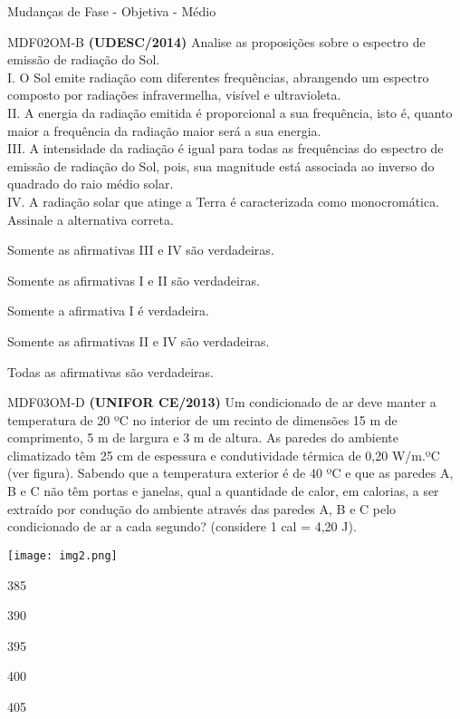 \documentclass[12pt]{article}
\begin{document}
\begin{quiz}{Mudanças de Fase - Objetiva - Médio}
		\begin{multi}[points=1,penalty=0]{MDF02OM-B}
			\textbf{(UDESC/2014)} Analise as proposições sobre o espectro de emissão de radiação do Sol.\\			
			I.	O Sol emite radiação com diferentes frequências, abrangendo um espectro composto por radiações infravermelha, visível e ultravioleta.\\
			II.	A energia da radiação emitida é proporcional a sua frequência, isto é, quanto maior a frequência da radiação maior será a sua energia.\\
			III.	A intensidade da radiação é igual para todas as frequências do espectro de emissão de radiação do Sol, pois, sua magnitude está associada ao inverso do quadrado do raio médio solar.\\
			IV.	A radiação solar que atinge a Terra é caracterizada como monocromática.\\			
			Assinale a alternativa correta.							
			\item Somente as afirmativas III e IV são verdadeiras.
			\item* Somente as afirmativas I e II são verdadeiras.
			\item Somente a afirmativa I é verdadeira.
			\item Somente as afirmativas II e IV são verdadeiras.
			\item Todas as afirmativas são verdadeiras.
		\end{multi}
		\begin{multi}[points=1,penalty=0]{MDF03OM-D}
			\textbf{(UNIFOR CE/2013)} Um condicionado de ar deve manter a temperatura de 20 ºC no interior de um recinto de dimensões 15 m de comprimento, 5 m de largura e 3 m de altura. As paredes do ambiente climatizado têm 25 cm de espessura e condutividade térmica de 0,20 W/m.ºC (ver figura).
			Sabendo que a temperatura exterior é de 40 ºC e que as paredes A, B e C não têm portas e janelas, qual a quantidade de calor, em calorias, a ser extraído por condução do ambiente através das paredes A, B e C pelo condicionado de ar a cada segundo? (considere 1 cal = 4,20 J).
			\begin{center}
				\texttt{[image: img2.png]}		
			\end{center}							
			\item 385
			\item 390
			\item 395
			\item* 400
			\item 405

\end{multi}
\end{quiz}
\end{document}
